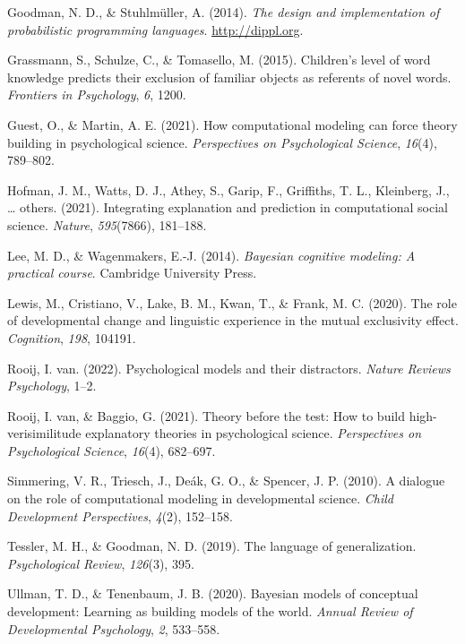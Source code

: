 \documentclass[
  man,floatsintext]{apa6}
\newlength{\cslhangindent}
\newlength{\cslentryspacingunit} %
\newenvironment{CSLReferences}[2] %
 {%
  \setlength{\parindent}{0pt}
  \ifodd #1
  \let\oldpar\par
  \def\par{\hangindent=\cslhangindent\oldpar}
  \fi
  \setlength{\parskip}{#2\cslentryspacingunit}
 }%
 {}
\begin{document}
\begin{CSLReferences}{1}{0}
\leavevmode{}%
Goodman, N. D., \& Stuhlmüller, A. (2014). \emph{{The design and implementation of probabilistic programming languages}}. \url{http://dippl.org}.

\leavevmode{}%
Grassmann, S., Schulze, C., \& Tomasello, M. (2015). Children's level of word knowledge predicts their exclusion of familiar objects as referents of novel words. \emph{Frontiers in Psychology}, \emph{6}, 1200.

\leavevmode{}%
Guest, O., \& Martin, A. E. (2021). How computational modeling can force theory building in psychological science. \emph{Perspectives on Psychological Science}, \emph{16}(4), 789--802.

\leavevmode{}%
Hofman, J. M., Watts, D. J., Athey, S., Garip, F., Griffiths, T. L., Kleinberg, J., \ldots{} others. (2021). Integrating explanation and prediction in computational social science. \emph{Nature}, \emph{595}(7866), 181--188.

\leavevmode{}%
Lee, M. D., \& Wagenmakers, E.-J. (2014). \emph{Bayesian cognitive modeling: A practical course}. Cambridge University Press.

\leavevmode{}%
Lewis, M., Cristiano, V., Lake, B. M., Kwan, T., \& Frank, M. C. (2020). The role of developmental change and linguistic experience in the mutual exclusivity effect. \emph{Cognition}, \emph{198}, 104191.

\leavevmode{}%
Rooij, I. van. (2022). Psychological models and their distractors. \emph{Nature Reviews Psychology}, 1--2.

\leavevmode{}%
Rooij, I. van, \& Baggio, G. (2021). Theory before the test: How to build high-verisimilitude explanatory theories in psychological science. \emph{Perspectives on Psychological Science}, \emph{16}(4), 682--697.

\leavevmode{}%
Simmering, V. R., Triesch, J., Deák, G. O., \& Spencer, J. P. (2010). A dialogue on the role of computational modeling in developmental science. \emph{Child Development Perspectives}, \emph{4}(2), 152--158.

\leavevmode{}%
Tessler, M. H., \& Goodman, N. D. (2019). The language of generalization. \emph{Psychological Review}, \emph{126}(3), 395.

\leavevmode{}%
Ullman, T. D., \& Tenenbaum, J. B. (2020). Bayesian models of conceptual development: Learning as building models of the world. \emph{Annual Review of Developmental Psychology}, \emph{2}, 533--558.

\end{CSLReferences}

\endgroup
\end{document}
